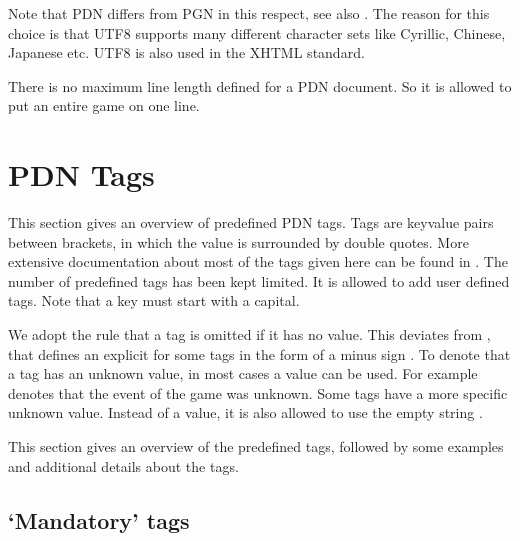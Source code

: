 \documentclass[letterpaper,10pt,english]{sphinxmanual}
\begin{document}
\sphinxAtStartPar
Note that PDN differs from PGN in this respect, see also .
The reason for this choice is that UTF\sphinxhyphen{}8 supports many different character sets like Cyrillic, Chinese, Japanese etc.
UTF\sphinxhyphen{}8 is also used in the XHTML standard.

\sphinxAtStartPar
There is no maximum line length defined for a PDN document. So it is allowed to put an entire game on one line.

\sphinxstepscope


\chapter{PDN Tags}
\label{\detokenize{pdntags:pdn-tags}}\label{\detokenize{pdntags::doc}}
\sphinxAtStartPar
This section gives an overview of predefined PDN tags. Tags are key\sphinxhyphen{}value pairs
between brackets, in which the value is surrounded by double quotes. More extensive
documentation about most of the tags given here can be found in . The number
of predefined tags has been kept limited. It is allowed to add user defined tags.
Note that a key must start with a capital.

\sphinxAtStartPar
We adopt the rule that a tag is omitted if it has no value. This deviates from ,
that defines an explicit  for some tags in the form of a minus sign .
To denote that a tag has an unknown value, in most cases a  value can be used. For
example \sphinxcode{\sphinxupquote{{[}Event "?"{]}}} denotes that the event of the game was unknown. Some tags have
a more specific unknown value. Instead of a  value, it is also allowed to
use the empty string .

\sphinxAtStartPar
This section gives an overview of the predefined tags, followed by some examples
and additional details about the tags.


\section{‘Mandatory’ tags}
\label{\detokenize{pdntags:mandatory-tags}}
\end{document}
